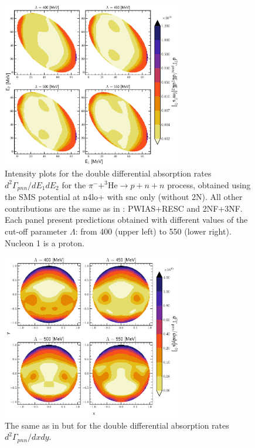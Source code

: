     \begin{figure}[h]
        \begin{center}
        \includegraphics[width=0.7\textwidth]{PlotData/PION/Dalitz_maps/figures/Dalitz_map_pnn_E1E2_cutofs_1NC.pdf}
        \end{center}
        \caption{Intensity plots for the double differential absorption rates
        $d^2 \Gamma_{pnn}/dE_1dE_2$ for the $\pi^- + ^3\text{He} \rightarrow p + n + n$
        process, obtained using the SMS potential at \gls{n4lo+}
        with \gls{snc} only (without 2N).
        All other contributions are the same as in : PWIAS+RESC and 2NF+3NF.
        Each panel present predictions obtained with different values of the cut-off parameter $\Lambda$:
        from \SI{400}{\mev} (upper left) to \SI{550}{\mev} (lower right). Nucleon 1 is a proton.}
        \label{pion_map_E1E2_cutoff_1NC}
    \end{figure}

    \begin{figure}[h]
        \begin{center}
        \includegraphics[width=0.7\textwidth]{PlotData/PION/Dalitz_maps/figures/Dalitz_map_pnn_xy_cutofs_1NC.pdf}
        \end{center}
        \caption{The same as in  but for the double differential absorption rates
        $d^2 \Gamma_{pnn}/dxdy$.}
        \label{pion_map_xy_cutoff_1NC}
    \end{figure}

